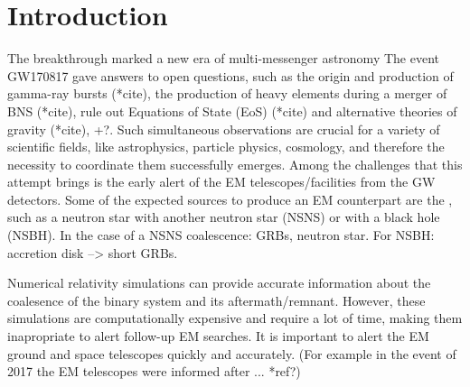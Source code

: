 \section{Introduction}


The breakthrough  \cite{LIGOScientific:2017ync} marked a new era of multi-messenger astronomy  The event GW170817 gave answers to open questions, such as the origin and production of gamma-ray bursts (*cite), the production of heavy elements during a merger of BNS (*cite), rule out Equations of State (EoS) (*cite) and alternative theories of gravity (*cite), +?. Such simultaneous observations are crucial for a variety of scientific fields, like astrophysics, particle physics, cosmology, and therefore the necessity to coordinate them successfully emerges. Among the challenges that this attempt brings is the early alert of the EM telescopes/facilities from the GW detectors. Some of the expected sources to produce an EM counterpart are the , such as a neutron star with another neutron star (NSNS) or with a black hole (NSBH). In the case of a NSNS coalescence: GRBs, neutron star. For NSBH: accretion disk --> short GRBs. 

Numerical relativity  simulations can provide accurate information about the coalesence of the binary system and its aftermath/remnant. However, these simulations are computationally expensive and require a lot of time, making them inapropriate to alert follow-up EM searches. It is important to alert the EM ground and space telescopes quickly and accurately. (For example in the event of 2017 the EM telescopes were informed after ... *ref?)
   
